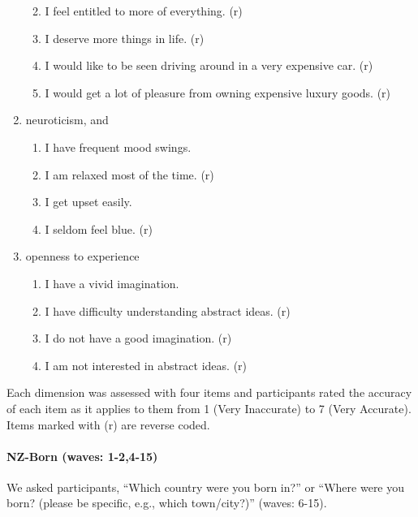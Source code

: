 \documentclass[
  singlecolumn]{article}
\let\oldparagraph\paragraph
\renewcommand{\paragraph}[1]{\oldparagraph{#1}\mbox{}}
\providecommand{\tightlist}{%
  \setlength{\itemsep}{0pt}\setlength{\parskip}{0pt}}\usepackage{longtable,booktabs,array}
\begin{document}
\begin{enumerate}
  \begin{enumerate}
  \def\labelenumii{\roman{enumii}.}
  \tightlist
  \item
    I feel entitled to more of everything. (r)
  \item
    I deserve more things in life. (r)
  \item
    I would like to be seen driving around in a very expensive car. (r)
  \item
    I would get a lot of pleasure from owning expensive luxury goods.
    (r)
  \end{enumerate}
\item
  neuroticism, and

  \begin{enumerate}
  \def\labelenumii{\roman{enumii}.}
  \tightlist
  \item
    I have frequent mood swings.
  \item
    I am relaxed most of the time. (r)
  \item
    I get upset easily.
  \item
    I seldom feel blue. (r)
  \end{enumerate}
\item
  openness to experience

  \begin{enumerate}
  \def\labelenumii{\roman{enumii}.}
  \tightlist
  \item
    I have a vivid imagination.
  \item
    I have difficulty understanding abstract ideas. (r)
  \item
    I do not have a good imagination. (r)
  \item
    I am not interested in abstract ideas. (r)
  \end{enumerate}
\end{enumerate}

Each dimension was assessed with four items and participants rated the
accuracy of each item as it applies to them from 1 (Very Inaccurate) to
7 (Very Accurate). Items marked with (r) are reverse coded.

\paragraph{NZ-Born (waves: 1-2,4-15)}\label{nz-born-waves-1-24-15}

We asked participants, ``Which country were you born in?'' or ``Where
were you born? (please be specific, e.g., which town/city?)'' (waves:
6-15).
\end{document}

